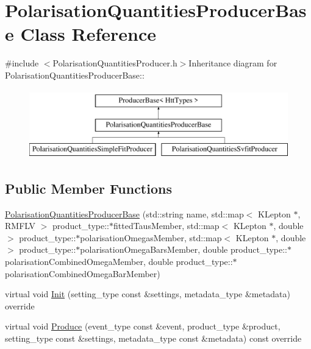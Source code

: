 \hypertarget{classPolarisationQuantitiesProducerBase}{
\section{PolarisationQuantitiesProducerBase Class Reference}
\label{classPolarisationQuantitiesProducerBase}
}


{\ttfamily \#include $<$PolarisationQuantitiesProducer.h$>$}Inheritance diagram for PolarisationQuantitiesProducerBase::\begin{figure}[H]
\begin{center}
\leavevmode
\includegraphics[height=3cm]{classPolarisationQuantitiesProducerBase}
\end{center}
\end{figure}
\subsection*{Public Member Functions}
\begin{DoxyCompactItemize}
\item 
\hyperlink{classPolarisationQuantitiesProducerBase_a2d1b02c1ddccb2f2e115fd19fd05217b}{PolarisationQuantitiesProducerBase} (std::string name, std::map$<$ KLepton $\ast$, RMFLV $>$ product\_\-type::$\ast$fittedTausMember, std::map$<$ KLepton $\ast$, double $>$ product\_\-type::$\ast$polarisationOmegasMember, std::map$<$ KLepton $\ast$, double $>$ product\_\-type::$\ast$polarisationOmegaBarsMember, double product\_\-type::$\ast$polarisationCombinedOmegaMember, double product\_\-type::$\ast$polarisationCombinedOmegaBarMember)
\item 
virtual void \hyperlink{classPolarisationQuantitiesProducerBase_ac27803aea612e48592db8b4a683b42da}{Init} (setting\_\-type const \&settings, metadata\_\-type \&metadata) override
\item 
virtual void \hyperlink{classPolarisationQuantitiesProducerBase_a6b3e115a3e937d4c9d79528d9e5e8a40}{Produce} (event\_\-type const \&event, product\_\-type \&product, setting\_\-type const \&settings, metadata\_\-type const \&metadata) const override
\end{DoxyCompactItemize}
